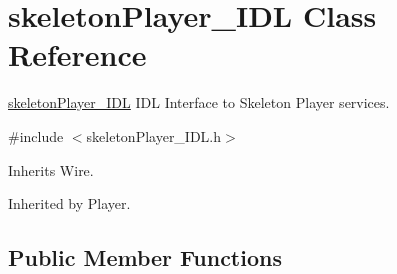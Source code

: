 \section{skeleton\+Player\+\_\+\+I\+DL Class Reference}
\label{classskeletonPlayer__IDL}


\mbox{\hyperlink{classskeletonPlayer__IDL}{skeleton\+Player\+\_\+\+I\+DL}} I\+DL Interface to Skeleton Player services.  




{\ttfamily \#include $<$skeleton\+Player\+\_\+\+I\+D\+L.\+h$>$}



Inherits Wire.



Inherited by Player.

\subsection*{Public Member Functions}
